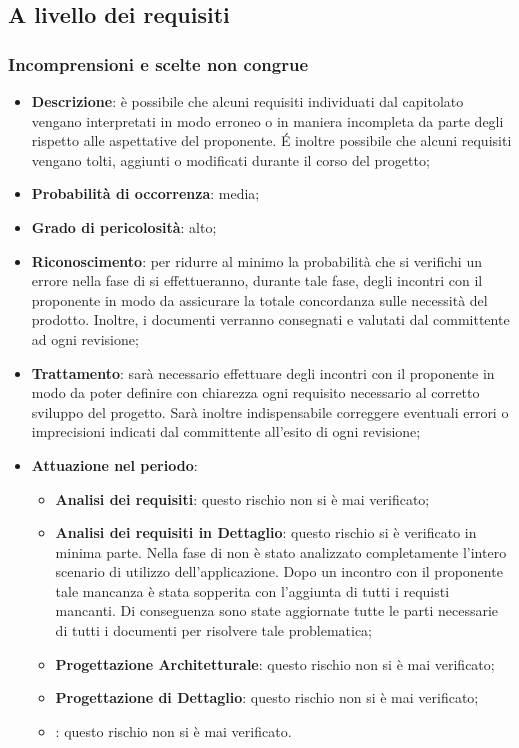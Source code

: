 	\subsection{A livello dei requisiti}
	
		\subsubsection{Incomprensioni e scelte non congrue}
		\begin{itemize}
			\item \textbf{Descrizione}: è possibile che alcuni requisiti individuati dal capitolato vengano interpretati in modo erroneo o in maniera incompleta da parte degli \textit{\Anas} rispetto alle aspettative del proponente. \'E inoltre possibile che alcuni requisiti vengano tolti, aggiunti o modificati durante il corso del progetto;
			\item \textbf{Probabilità di occorrenza}: media;
			\item \textbf{Grado di pericolosità}: alto;
			\item \textbf{Riconoscimento}: per ridurre al minimo la probabilità che si verifichi un errore nella fase di \textit{\AdR{}} si effettueranno, durante tale fase, degli incontri con il proponente in modo da assicurare la totale concordanza sulle necessità del prodotto. Inoltre, i documenti verranno consegnati e valutati dal committente ad ogni revisione;
			\item \textbf{Trattamento}: sarà necessario effettuare degli incontri con il proponente in modo da poter definire con chiarezza ogni requisito necessario al corretto sviluppo del progetto. Sarà inoltre indispensabile correggere eventuali errori o imprecisioni indicati dal committente all'esito di ogni revisione;
			\item \textbf{Attuazione nel periodo}:
			\begin{itemize}
				\item \textbf{Analisi dei requisiti}: questo rischio non si è mai verificato;
				\item \textbf{Analisi dei requisiti in Dettaglio}: questo rischio si è verificato in minima parte. Nella fase di \AdR{} non è stato analizzato completamente l'intero scenario di utilizzo dell'applicazione. Dopo un incontro con il proponente tale mancanza è stata sopperita con l'aggiunta di tutti i requisti mancanti. Di conseguenza sono state aggiornate tutte le parti necessarie di tutti i documenti per risolvere tale problematica; 
				\item \textbf{Progettazione Architetturale}: questo rischio non si è mai verificato;
				\item \textbf{Progettazione di Dettaglio}: questo rischio non si è mai verificato;
				\item \textbf{\CO}: questo rischio non si è mai verificato. 
			\end{itemize}
		\end{itemize}
	
